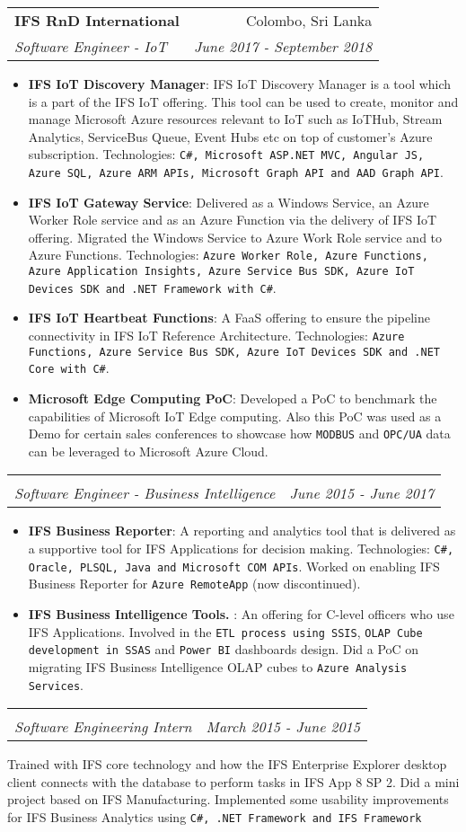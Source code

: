\documentclass[a4paper,11pt]{article}
\makeatletter
\newcommand{\resumeItem}[2]{
  \item\small{
    \textbf{#1}{: #2 \vspace{-2pt}}
  }
}
\newcommand{\resumeSubheading}[4]{
  \vspace{-1pt}\item
    \begin{tabular*}{0.97\textwidth}{l@{\extracolsep{\fill}}r}
      \textbf{#1} & #2 \\
      \textit{\small#3} & \textit{\small #4} \\
    \end{tabular*}\vspace{-5pt}
}
\newcommand{\resumeSubItem}[2]{\resumeItem{#1}{#2}\vspace{-4pt}}
\newcommand{\resumeItemListStart}{\begin{itemize}}
\newcommand{\resumeItemListEnd}{\end{itemize}\vspace{-5pt}}
\makeatother
\begin{document}
    \resumeSubheading
      {IFS RnD International}{Colombo, Sri Lanka}
      {Software Engineer - IoT}{June 2017 - September 2018}
      \resumeItemListStart
        \resumeItem{IFS IoT Discovery Manager}
          {IFS IoT Discovery Manager is a tool which is a part of the IFS IoT offering. This tool can be used to create, monitor and manage Microsoft Azure resources relevant to IoT such as IoTHub, Stream Analytics, ServiceBus Queue, Event Hubs etc on top of customer's Azure subscription. Technologies: \texttt{C\#, Microsoft ASP.NET MVC, Angular JS, Azure SQL, Azure ARM APIs, Microsoft Graph API and AAD Graph API}.}
        \resumeItem{IFS IoT Gateway Service}
          {Delivered as a Windows Service, an Azure Worker Role service and as an Azure Function via the delivery of IFS IoT offering. Migrated the Windows Service to Azure Work Role service and to Azure Functions. Technologies: \texttt{Azure Worker Role, Azure Functions, Azure Application Insights, Azure Service Bus SDK, Azure IoT Devices SDK and .NET Framework with C\#}. }
        \resumeItem{IFS IoT Heartbeat Functions}
          {A FaaS offering to ensure the pipeline connectivity in IFS IoT Reference Architecture. Technologies: \texttt{Azure Functions, Azure Service Bus SDK, Azure IoT Devices SDK and .NET Core with C\#}.}
          \resumeSubItem{Microsoft Edge Computing PoC}
      {Developed a PoC to benchmark the capabilities of Microsoft IoT Edge computing. Also this PoC was used as a Demo for certain sales conferences to showcase how \texttt{MODBUS} and \texttt{OPC/UA} data can be leveraged to Microsoft Azure Cloud.}
      \resumeItemListEnd
      
    \resumeSubheading {}{}
      {Software Engineer - Business Intelligence}{June 2015 - June 2017}
      \resumeItemListStart
        \resumeItem{IFS Business Reporter}
          {A reporting and analytics tool that is delivered as a supportive tool for IFS Applications for decision making. Technologies: \texttt{C\#, Oracle, PLSQL, Java and Microsoft COM APIs}. Worked on enabling IFS Business Reporter for \texttt{Azure RemoteApp} (now discontinued).}
        \resumeItem{IFS Business Intelligence Tools. }
          {An offering for C-level officers who use IFS Applications. Involved in the \texttt{ETL process using SSIS}, \texttt{OLAP Cube development in SSAS} and \texttt{Power BI} dashboards design. Did a PoC on migrating IFS Business Intelligence OLAP cubes to  \texttt{Azure Analysis Services}.}
      \resumeItemListEnd  
      
    \resumeSubheading{}{}
      {Software Engineering Intern}{March 2015 - June 2015}
      \resumeItemListStart
        {Trained with IFS core technology and how the IFS Enterprise Explorer desktop client connects with the database to perform tasks in IFS App 8 SP 2. Did a mini project based on IFS Manufacturing. Implemented some usability improvements for IFS Business Analytics using \texttt{C\#, .NET Framework and IFS Framework}}
      \resumeItemListEnd           
      
\end{document}

